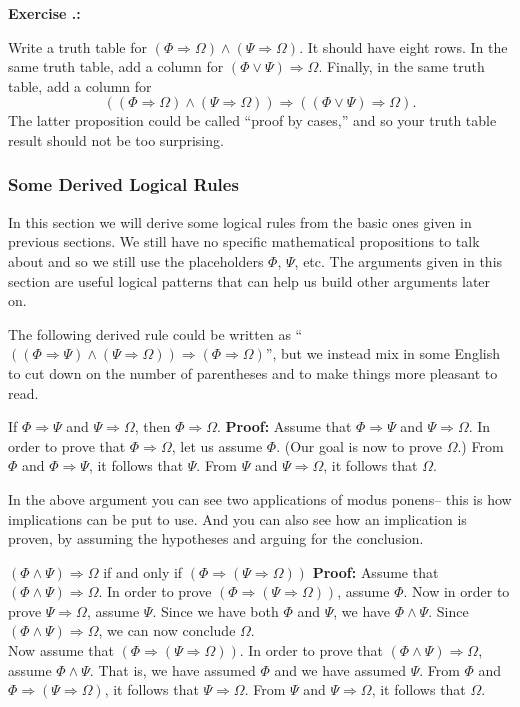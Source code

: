 \documentclass[12pt]{article}
\newcommand{\AND}{\wedge}
\newcommand{\OR}{\vee}
\newcommand{\ARR}{\Rightarrow}
\newcounter{exercise}[subsubsection]
\newcounter{rule}
\def\putRuleNumber{\refstepcounter{rule}\therule}
\newcommand{\ex}[1]{ \refstepcounter{exercise} \textbf{Exercise \thesubsubsection.\theexercise:}\begin{adjustwidth}{2em}{}#1\end{adjustwidth}}
\newcommand{\DRULEPF}[3]{\begin{tcolorbox}[title=Derived Rule \putRuleNumber: #1,colbacktitle=white,coltitle=black,colback=white] {#2} \tcblower \textbf{Proof:} {#3} \end{tcolorbox}}
\def\pA{\Phi}
\def\pB{\Psi}
\def\pC{\Omega}
\begin{document}
\ex{
Write a truth table for $(\pA\ARR\pC)\AND(\pB\ARR\pC)$. It should have eight rows.
In the same truth table, add a column for $(\pA\OR\pB)\ARR\pC$.
Finally, in the same truth table, add a column for 
$$((\pA\ARR\pC)\AND(\pB\ARR\pC))\ARR((\pA\OR\pB)\ARR\pC).$$
The latter proposition could be called ``proof by cases,'' and so your truth table result should not be too surprising.
}

\subsubsection{Some Derived Logical Rules}
\label{sec:derived1}

In this section we will derive some logical rules from the basic ones given in previous sections.
We still have no specific mathematical propositions to talk about and so we still use the placeholders $\pA$, $\pB$, etc.
The arguments given in this section are useful logical patterns that can help us build other arguments later on.

The following derived rule could be written as ``$((\pA\ARR\pB)\AND(\pB\ARR\pC))\ARR(\pA\ARR\pC)$'',
but we instead mix in some English to cut down on the number of parentheses and to make things more pleasant to read.

\DRULEPF{Transitivity of Implication}{
If $\pA\ARR\pB$ and $\pB\ARR\pC$, then $\pA\ARR\pC$.
}{
Assume that $\pA\ARR\pB$ and $\pB\ARR\pC$.
In order to prove that $\pA\ARR\pC$, let us assume $\pA$.
(Our goal is now to prove $\pC$.)
From $\pA$ and $\pA\ARR\pB$, it follows that $\pB$.
From $\pB$ and $\pB\ARR\pC$, it follows that $\pC$.
}

In the above argument you can see two applications of modus ponens-- this is how implications can be put to use.
And you can also see how an implication is proven, by assuming the hypotheses and arguing for the conclusion.

\def\lsp{\\[-0.4em]}

\DRULEPF{Conjunction and Implication}{
$(\pA\AND\pB)\ARR\pC$ if and only if $(\pA\ARR(\pB\ARR\pC))$
}{
Assume that $(\pA\AND\pB)\ARR\pC$.
In order to prove $(\pA\ARR(\pB\ARR\pC))$, assume $\pA$.
Now in order to prove $\pB\ARR\pC$, assume $\pB$.
Since we have both $\pA$ and $\pB$, we have $\pA\AND\pB$.
Since $(\pA\AND\pB)\ARR\pC$, we can now conclude $\pC$.\lsp

Now assume that $(\pA\ARR(\pB\ARR\pC))$.
In order to prove that $(\pA\AND\pB)\ARR\pC$,
assume $\pA\AND\pB$.
That is, we have assumed $\pA$ and we have assumed $\pB$.
From $\pA$ and $\pA\ARR(\pB\ARR\pC)$, it follows that $\pB\ARR\pC$.
From $\pB$ and $\pB\ARR\pC$, it follows that $\pC$.
}
\end{document}
